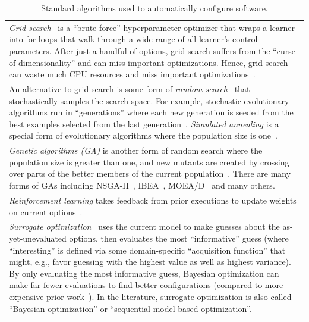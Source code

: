 \begin{table}[!b]
\begin{tabular}{|p{.99\linewidth}|}
\textit{Grid search}~\cite{bergstra2011algorithms, tantithamthavorn2016automated} is a ``brute force'' hyperparameter optimizer that wraps a learner into for-loops that walk through a wide range of all learner's control parameters. After just a handful of options, grid search suffers from the ``curse of dimensionality'' and can miss important optimizations. Hence, grid search can waste much CPU resources and miss important optimizations~\cite{bergstra2012random}.\\
\rowcolor{blue!10}
An alternative to grid search is some form of \textit{random search}~\cite{bergstra2012random} that stochastically samples the search space. For example,
stochastic evolutionary algorithms run in ``generations'' where each new generation is seeded from the best examples selected from the last generation~\cite{goldberg2006genetic}. {\em Simulated annealing} is a special form of evolutionary algorithms where the population size is one~\cite{kirkpatrick1983optimization}. 
\\
\textit{Genetic algorithms (GA)} is another form of random search where the population size is greater than one, and new mutants are created by crossing over parts of the better members of the current population~\cite{goldberg2006genetic,Panichella:2013}.
There are many forms of GAs including NSGA-II~\cite{deb2002fast}, IBEA~\cite{zitzler2004indicator}, MOEA/D~\cite{zhang2007moea} and many others.
\\\rowcolor{blue!10}
{\em Reinforcement learning}  takes feedback from prior executions to update  weights on current options~\cite{DBLP:journals/corr/abs-1902-06583,sutton2018reinforcement,Li:2017}. 
\\  
{\em Surrogate optimization}~\cite{alipourfard2017cherrypick, snoek2012practical,brochu2010tutorial}
uses the current model to make guesses about the as-yet-unevaluated options\cite{eggensperger2013towards}, then evaluates the most ``informative'' guess (where ``interesting'' is defined via some  domain-specific ``acquisition function''
that might, e.g., favor guessing with the highest value as well as highest variance).
By only evaluating the most informative guess, Bayesian optimization can 
make far fewer evaluations to find better configurations (compared to more expensive prior work~\cite{guo2013variability, sarkar2015cost, nair2018finding}).
In the literature, surrogate optimization is also called ``Bayesian optimization'' or
``sequential model-based optimization''.
\\\hline
\end{tabular}
\caption{Standard algorithms used to automatically configure software.}\label{tbl:egconfig}
\end{table}

